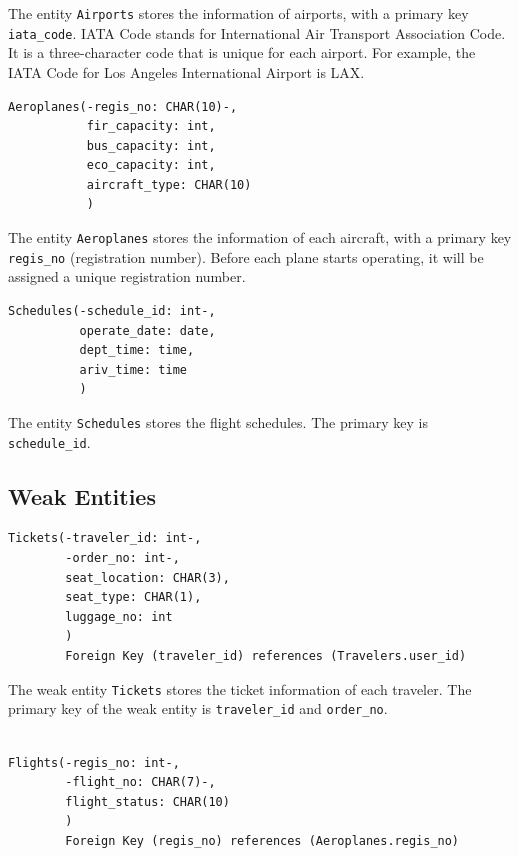 \documentclass{article}
\begin{document}
	The entity \texttt{Airports} stores the information of airports, with a primary key \texttt{iata\_code}. IATA Code stands for International Air Transport Association Code. It is a three-character code that is unique for each airport. For example, the IATA Code for Los Angeles International Airport is LAX.
	
	\begin{lstlisting}[keepspaces=true]               
Aeroplanes(-regis_no: CHAR(10)-,
           fir_capacity: int,
           bus_capacity: int, 
           eco_capacity: int,
           aircraft_type: CHAR(10)
           )
	\end{lstlisting}    
	
	The entity \texttt{Aeroplanes} stores the information of each aircraft, with a primary key \texttt{regis\_no} (registration number). Before each plane starts operating, it will be assigned a unique registration number.
	
	\begin{lstlisting}[keepspaces=true] 
Schedules(-schedule_id: int-, 
          operate_date: date,
          dept_time: time,
          ariv_time: time
          )
	\end{lstlisting}
	
	The entity \texttt{Schedules} stores the flight schedules. The primary key is \texttt{schedule\_id}.
	
	\subsection{Weak Entities}
	
	\begin{lstlisting}[keepspaces=true]
Tickets(-traveler_id: int-, 
        -order_no: int-, 
        seat_location: CHAR(3),
        seat_type: CHAR(1),
        luggage_no: int
        )
        Foreign Key (traveler_id) references (Travelers.user_id)
	\end{lstlisting}    

	The weak entity \texttt{Tickets} stores the ticket information of each traveler. The primary key of the weak entity is \texttt{traveler\_id} and \texttt{order\_no}. 

	\begin{lstlisting}[keepspaces=true]        
		
Flights(-regis_no: int-, 
        -flight_no: CHAR(7)-,
        flight_status: CHAR(10)
        )
        Foreign Key (regis_no) references (Aeroplanes.regis_no)
	\end{lstlisting}
\end{document}
